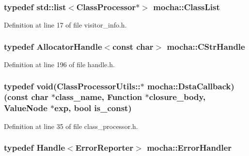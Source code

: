\hypertarget{namespacemocha_a01ec919b1dd7cd6a9d355222341db47a}{
\subsubsection[{ClassList}]{\setlength{\rightskip}{0pt plus 5cm}typedef std::list$<${\bf ClassProcessor}$\ast$$>$ {\bf mocha::ClassList}}}
\label{namespacemocha_a01ec919b1dd7cd6a9d355222341db47a}


Definition at line 17 of file visitor\_\-info.h.

\hypertarget{namespacemocha_a381f97609b5c47ac31b9a439d9e0a1da}{
\subsubsection[{CStrHandle}]{\setlength{\rightskip}{0pt plus 5cm}typedef {\bf AllocatorHandle}$<$const char$>$ {\bf mocha::CStrHandle}}}
\label{namespacemocha_a381f97609b5c47ac31b9a439d9e0a1da}


Definition at line 196 of file handle.h.

\hypertarget{namespacemocha_ac3d8a2fe64806b144916b0b16719a540}{
\subsubsection[{DstaCallback}]{\setlength{\rightskip}{0pt plus 5cm}typedef void(ClassProcessorUtils::$\ast$ {\bf mocha::DstaCallback})(const char $\ast$class\_\-name, {\bf Function} $\ast$closure\_\-body, {\bf ValueNode} $\ast$exp, bool is\_\-const)}}
\label{namespacemocha_ac3d8a2fe64806b144916b0b16719a540}


Definition at line 35 of file class\_\-processor.h.

\hypertarget{namespacemocha_a62a8540d653f9de4f6198d4a857c456f}{
\subsubsection[{ErrorHandler}]{\setlength{\rightskip}{0pt plus 5cm}typedef {\bf Handle}$<${\bf ErrorReporter}$>$ {\bf mocha::ErrorHandler}}}
\label{namespacemocha_a62a8540d653f9de4f6198d4a857c456f}


